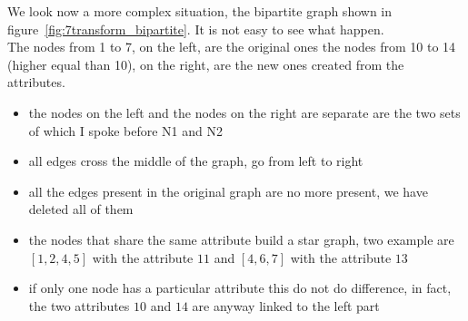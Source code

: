 \documentclass[epsfig,a4paper,11pt,titlepage,twoside,openany]{book}
\begin{document}
%
We look now a more complex situation, the bipartite graph shown in figure~\ref{fig:7transform_bipartite}. It is not easy to see what happen.\\
The nodes from 1 to 7, on the left, are the original ones the nodes from 10 to 14 (higher equal than 10), on the right, are the new ones created from the attributes. 
\begin{itemize}
	\item the nodes on the left and the nodes on the right are separate are the two sets of which I spoke before N1 and N2
	\item all edges cross the middle of the graph, go from left to right
	\item all the edges present in the original graph are no more present, we have deleted all of them
	\item the nodes that share the same attribute build a star graph, two example are $[1,2,4,5]$ with the attribute $11$ and $[4,6,7]$ with the attribute $13$
	\item  if only one node has a particular attribute this do not do difference, in fact, the two attributes $10$ and $14$ are anyway linked to the left part
\end{itemize}
%
%
%
\ifcomment	%
\end{document}
